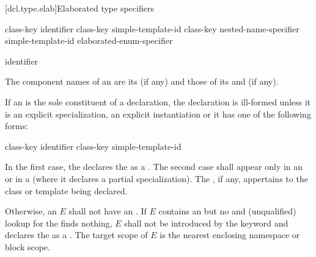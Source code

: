 [dcl.type.elab]{Elaborated type specifiers}%
%
%

\begin{bnf}
\br
    class-key   identifier\br
    class-key simple-template-id\br
    class-key nested-name-specifier  simple-template-id\br
    elaborated-enum-specifier
\end{bnf}

\begin{bnf}
\br
      identifier
\end{bnf}

\pnum
{}%
The component names of an  are
its  (if any) and
those of its  and
 (if any).

\pnum
{}%
%
If an  is the sole constituent of a
declaration, the declaration is ill-formed unless it is an explicit
specialization, an explicit
instantiation or it has one of the following
forms:

\begin{ncsimplebnf}
class-key  identifier \terminal{;}\br
class-key  simple-template-id \terminal{;}
\end{ncsimplebnf}

In the first case,
the  declares
the  as a .
The second case shall appear only
in an  or
in a 
(where it declares a partial specialization).
The , if any, appertains
to the class or template being declared.

\pnum
Otherwise, an  $E$ shall not have
an .
If $E$ contains an 
but no  and
(unqualified) lookup for the  finds nothing,
$E$ shall not be introduced by the  keyword and
declares the  as a .
The target scope of $E$ is the nearest enclosing namespace or block scope.

